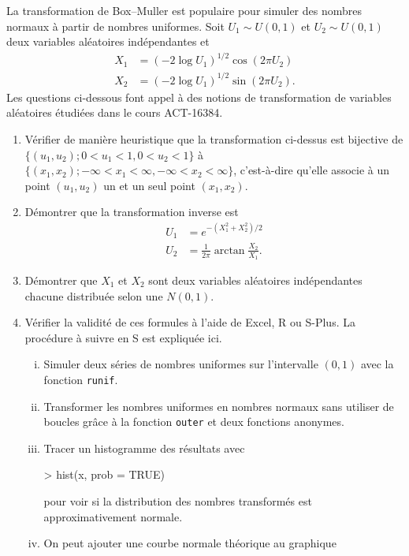 \begin{exercice}
  La transformation de Box--Muller est populaire pour simuler des
  nombres normaux à partir de nombres uniformes. Soit $U_1 \sim U(0,
  1)$ et $U_2 \sim U(0, 1)$ deux variables aléatoires indépendantes et
  \begin{align*}
    X_1 &= (-2 \log U_1)^{1/2} \cos (2\pi U_2) \\
    X_2 &= (-2 \log U_1)^{1/2} \sin (2\pi U_2).
  \end{align*}
  Les questions ci-dessous font appel à des notions de transformation
  de variables aléatoires étudiées dans le cours ACT-16384.
  \begin{enumerate}
  \item Vérifier de manière heuristique que la transformation
    ci-dessus est bijective de $\{(u_1, u_2); 0 < u_1 < 1, 0 < u_2 <
    1\}$ à $\{(x_1, x_2); -\infty < x_1 < \infty, -\infty < x_2 <
    \infty\}$, c'est-à-dire qu'elle associe à un point $(u_1, u_2)$ un
    et un seul point $(x_1, x_2)$.
  \item Démontrer que la transformation inverse est
    \begin{align*}
      U_1 &= e^{-(X_1^2 + X_2^2)/2} \\
      U_2 &= \frac{1}{2 \pi} \arctan \frac{X_2}{X_1}.
    \end{align*}
  \item Démontrer que $X_1$ et $X_2$ sont deux variables aléatoires
    indépendantes chacune distribuée selon une $N(0, 1)$.
  \item Vérifier la validité de ces formules à l'aide de Excel,
    \textsf{R} ou S-Plus. La procédure à suivre en S est expliquée
    ici.
    \begin{enumerate}[i)]
    \item Simuler deux séries de nombres uniformes sur l'intervalle
      $(0, 1)$ avec la fonction \texttt{runif}.
    \item Transformer les nombres uniformes en nombres normaux sans
      utiliser de boucles grâce à la fonction \texttt{outer} et deux
      fonctions anonymes.
    \item Tracer un histogramme des résultats avec
\begin{Schunk}
\begin{Sinput}
> hist(x, prob = TRUE)
\end{Sinput}
\end{Schunk}
      pour voir si la distribution des nombres transformés est
      approximativement normale.
    \item On peut ajouter une courbe normale théorique au graphique

\end{enumerate}
\end{enumerate}
\end{exercice}
